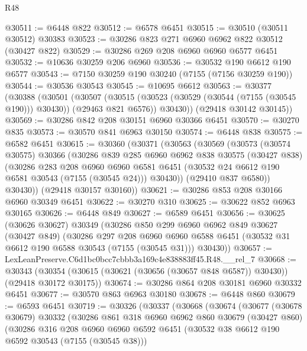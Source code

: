 \begin{lexlean}{R48}
\begin{coremodule}
@30511 := @6448 @822
@30512 := @6578 @6451
@30515 := @30510 (@30511 @30512) @30383
@30523 := @30286 @823 @271 @6960 @6962 @822 @30512 (@30427 @822)
@30529 := @30286 @269 @208 @6960 @6960 @6577 @6451
@30532 := @10636 @30259 @206 @6960
@30536 := @30532 @190 @6612 @190 @6577
@30543 := @7150 @30259 @190 @30240 (@7155 (@7156 @30259 @190))
@30544 := @30536 @30543
@30545 := @10695 @6612
@30563 := @30377
    (@30388
      (@30501
        (@30507
          (@30515 (@30523 (@30529 (@30544 (@7155 (@30545 @190))) @30430)) (@29463 @821 @6576))
          @30430))
      (@29418 @30142 @30145))
@30569 := @30286 @842 @208 @30151 @6960 @30366 @6451
@30570 := @30270 @835
@30573 := @30570 @841 @6963 @30150
@30574 := @6448 @838
@30575 := @6582 @6451
@30615 := @30360
    (@30371
      (@30563
        (@30569
          (@30573
            (@30574 @30575)
            @30366
            (@30286
              @839
              @285
              @6960
              @6962
              @838
              @30575
              (@30427 @838)
              (@30286
                @283
                @208
                @6960
                @6960
                @6581
                @6451
                (@30532 @24 @6612 @190 @6581 @30543 (@7155 (@30545 @24)))
                @30430))
            (@29410 @837 @6580))
          @30430))
      (@29418 @30157 @30160))
@30621 := @30286 @853 @208 @30166 @6960 @30349 @6451
@30622 := @30270 @310
@30625 := @30622 @852 @6963 @30165
@30626 := @6448 @849
@30627 := @6589 @6451
@30656 := @30625
    (@30626 @30627)
    @30349
    (@30286
      @850
      @299
      @6960
      @6962
      @849
      @30627
      (@30427 @849)
      (@30286
        @297
        @208
        @6960
        @6960
        @6588
        @6451
        (@30532 @31 @6612 @190 @6588 @30543 (@7155 (@30545 @31)))
        @30430))
@30657 := LexLeanPreserve.C6d1bc0bcc7cbbb3a169c4e838883ff45.R48.__rel_7
@30668 := @30343
    (@30354 (@30615 (@30621 (@30656 (@30657 @848 @6587)) @30430)) (@29418 @30172 @30175))
@30674 := @30286 @864 @208 @30181 @6960 @30332 @6451
@30677 := @30570 @863 @6963 @30180
@30678 := @6448 @860
@30679 := @6593 @6451
@30719 := @30326
    (@30337
      (@30668
        (@30674
          (@30677
            (@30678 @30679)
            @30332
            (@30286
              @861
              @318
              @6960
              @6962
              @860
              @30679
              (@30427 @860)
              (@30286
                @316
                @208
                @6960
                @6960
                @6592
                @6451
                (@30532 @38 @6612 @190 @6592 @30543 (@7155 (@30545 @38)))

\end{coremodule}
\end{lexlean}
